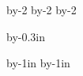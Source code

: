 %
%
%



\advance\pagewidth by-2\hoffset		%
\advance\pagewidth by-2\pageshift	%
\advance\fullpageheight by-2\voffset	%

\pageheight\fullpageheight		%
\advance\pageheight by-0.3in		%

\advance\hoffset by-1in			%
\advance\voffset by-1in

\setpage				%
